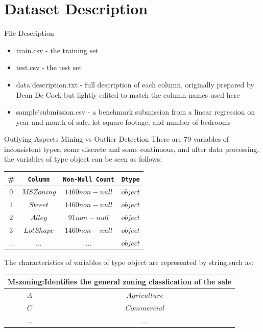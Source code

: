 \documentclass[
size=14pt,
paper=smartboard,  %
mode=present, 		%
display=slides, 	%
style=tuliplab,  	%
pauseslide,
fleqn,leqno]{powerdot}
\begin{document}
	\section{Dataset Description}
	\begin{slide}[toc=,bm=]{File Description}
	\begin{itemize}
		\item train.csv - the training set
		\item test.csv - the test set
		\item data˙description.txt - full description of each column, originally prepared by	Dean De Cock but lightly edited to match the column names used here
		\item sample˙submission.csv - a benchmark submission from a linear regression on year and month of sale, lot square footage, and number of bedrooms
	\end{itemize}
	\end{slide}
	\begin{slide}[toc=,bm=]{Outlying Aspects Mining vs Outlier Detection}
		There are 79 variables of inconsistent types, some discrete and some continuous, and after data processing, the variables of type object can be seen as follows:\\
		\begin{center}
			\begin{tabular}{c c c c}
				\toprule
				\# & \texttt{Column}  & \texttt{Non-Null Count} & \texttt{Dtype} \\
				\midrule
				$0$
				&  {$MSZoning$} &  {$1460 non-null$} &  {$object$}  \\
				$1$
				&  {$Street$} &  {$1460 non-null$}&  {$object$} \\
				$2$
				&  {$Alley$} &  {$91 non-null$} &  {$object$} \\
				$3$
				&  {$LotShape$} &  {$1460 non-null$}&  {$object$} \\
				$...$
				&  {$...$} &  {$...$} &  {$object$}\\
				\bottomrule
			\end{tabular}
		\end{center}
		The characteristics of variables of type object are represented by string,such as:
		\begin{center}
			\begin{tabular}{c c}
				\toprule
				\multicolumn{2}{c}{Mszoning:Identifies the general zoning classfication of the sale} \\ 
				\midrule
				$A$ &  {$Agriculture$}  \\
				$C$ &  {$Commercial$}  \\
				$...$ &  {$...$}  \\
				\bottomrule
			\end{tabular}
		\end{center}	
	\end{slide}
\end{document}
